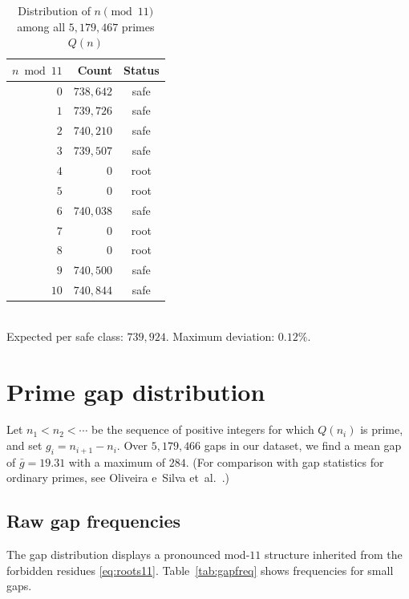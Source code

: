 \documentclass[11pt,a4paper]{article}
\theoremstyle{plain}
\theoremstyle{definition}
\theoremstyle{remark}
\begin{document}
\begin{table}[ht]
\centering
\caption{Distribution of $n \pmod{11}$ among all $5{,}179{,}467$ primes $Q(n)$}
\label{tab:residues}
\smallskip
\begin{tabular}{@{}rrc@{}}
\toprule
$n \bmod 11$ & Count & Status \\
\midrule
$0$  & $738{,}642$ & safe \\
$1$  & $739{,}726$ & safe \\
$2$  & $740{,}210$ & safe \\
$3$  & $739{,}507$ & safe \\
$4$  & $0$ & root \\
$5$  & $0$ & root \\
$6$  & $740{,}038$ & safe \\
$7$  & $0$ & root \\
$8$  & $0$ & root \\
$9$  & $740{,}500$ & safe \\
$10$ & $740{,}844$ & safe \\
\bottomrule
\end{tabular}\\[4pt]
\small Expected per safe class: $739{,}924$. Maximum deviation: $0.12\%$.
\end{table}


\section{Prime gap distribution}
\label{sec:gaps}

Let $n_1 < n_2 < \cdots$ be the sequence of positive integers for which $Q(n_i)$ is prime, and set $g_i = n_{i+1} - n_i$. Over $5{,}179{,}466$ gaps in our dataset, we find a mean gap of $\bar{g} = 19.31$ with a maximum of $284$. (For comparison with gap statistics for ordinary primes, see Oliveira e~Silva et~al.~\cite{oliveira2014}.)

\subsection{Raw gap frequencies}

The gap distribution displays a pronounced mod-$11$ structure inherited from the forbidden residues \eqref{eq:roots11}. Table~\ref{tab:gapfreq} shows frequencies for small gaps.
\end{document}
